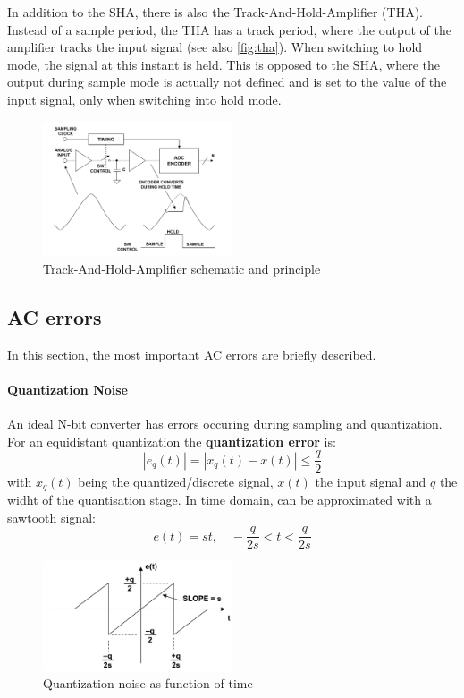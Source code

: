 In addition to the SHA, there is also the Track-And-Hold-Amplifier (THA). Instead of a sample period, the THA has a track period, where the output of the amplifier tracks the input signal (see also \autoref{fig:tha}). When switching to hold mode, the signal at this instant is held. This is opposed to the SHA, where the output during sample mode is actually not defined and is set to the value of the input signal, only when switching into hold mode. 

\begin{figure}[H]
	\centering
	\includegraphics[width = 0.5\textwidth]{chap/02-theory/img/tha}
	\caption{Track-And-Hold-Amplifier schematic and principle \cite{walt}}
	\label{fig:tha}
\end{figure}
\subsection{AC errors}
In this section, the most important AC errors are briefly described.

\paragraph{Quantization Noise}
An ideal N-bit converter has errors occuring during sampling and quantization. For an equidistant quantization the \textbf{quantization error} is:
\begin{equation}
	\left| e_q(t) \right| = \left| x_q(t) - x(t) \right| \leq \frac{q}{2}
\end{equation}
with $x_q(t)$ being the quantized/discrete signal, $x(t)$ the input signal and $q$ the widht of the quantisation stage. \cite{puente2015}
In time domain, can be approximated with a sawtooth signal:
\begin{equation}
	e(t) = st, \quad -\frac{q}{2s} < t < \frac{q}{2s} 
\end{equation}
\begin{figure}[H]
	\centering
	\includegraphics[width = 0.5\textwidth]{chap/02-theory/img/quantization_error}
	\caption{Quantization noise as function of time\cite{walt}}
	\label{fig:eq}
\end{figure}

